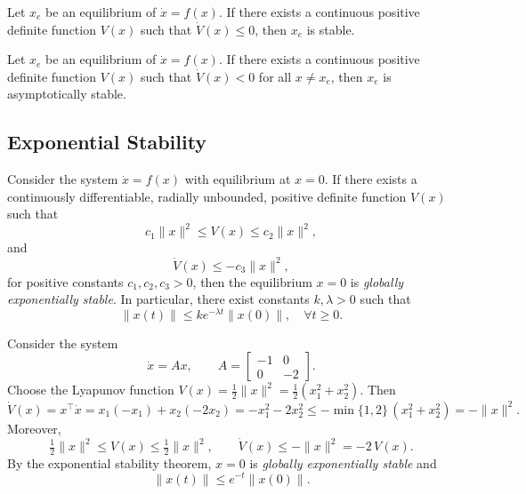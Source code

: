 \begin{corollary}
	Let $x_e$ be an equilibrium of $\dot{x}=f(x)$.  
	If there exists a continuous positive definite function $V(x)$ such that $\dot{V}(x) \leq 0$, then $x_e$ is stable.
\end{corollary}

\begin{corollary}
	Let $x_e$ be an equilibrium of $\dot{x}=f(x)$.  
	If there exists a continuous positive definite function $V(x)$ such that $\dot{V}(x) < 0$ for all $x\neq x_e$, then $x_e$ is asymptotically stable.
\end{corollary}

\subsection{Exponential Stability}

\begin{theorem}
	Consider the system $\dot{x}=f(x)$ with equilibrium at $x=0$.  
	If there exists a continuously differentiable, radially unbounded, positive definite function $V(x)$ such that
	\begin{equation}
		c_1 \|x\|^2 \leq V(x) \leq c_2 \|x\|^2,
	\end{equation}
	and
	\begin{equation}
		\dot{V}(x) \leq -c_3 \|x\|^2,
	\end{equation}
	for positive constants $c_1, c_2, c_3 > 0$, then the equilibrium $x=0$ is \emph{globally exponentially stable}.  
	In particular, there exist constants $k,\lambda > 0$ such that
	\begin{equation}
		\|x(t)\| \leq k e^{-\lambda t}\|x(0)\|, \quad \forall t \geq 0.
	\end{equation}
\end{theorem}

\begin{example}
Consider the system
\begin{equation}
    \dot{x} = Ax,\qquad A=\begin{bmatrix}-1 & 0\\ 0 & -2\end{bmatrix}.
\end{equation}
Choose the Lyapunov function $V(x)=\tfrac{1}{2}\|x\|^2=\tfrac{1}{2}(x_1^2+x_2^2)$. Then
\begin{equation}
    \dot{V}(x) = x^\top \dot{x} = x_1(-x_1)+x_2(-2x_2) = -x_1^2-2x_2^2
    \le -\min\{1,2\}\,(x_1^2+x_2^2) = -\|x\|^2.
\end{equation}
Moreover,
\begin{equation}
    \tfrac{1}{2}\|x\|^2 \le V(x) \le \tfrac{1}{2}\|x\|^2, 
    \qquad \dot{V}(x) \le -\|x\|^2 = -2\,V(x).
\end{equation}
By the exponential stability theorem, $x=0$ is \emph{globally exponentially stable} and
\begin{equation}
    \|x(t)\| \le e^{-t}\|x(0)\|.
\end{equation}
\end{example}

